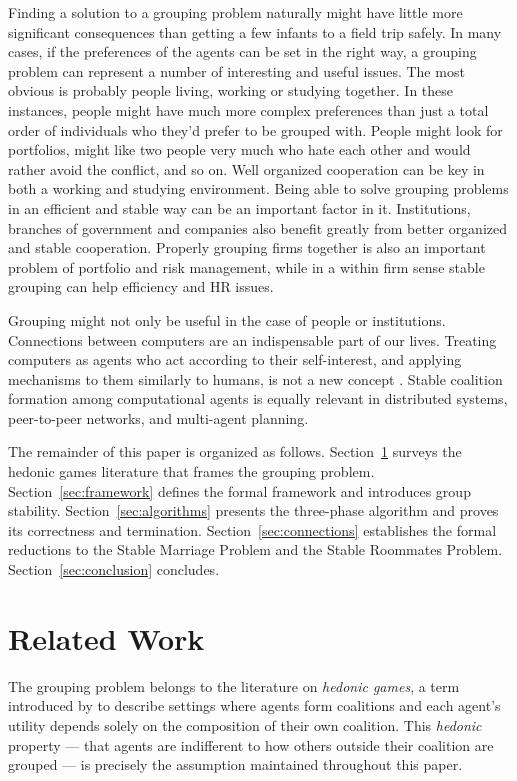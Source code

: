 \documentclass{elsarticle}
\begin{document}
Finding a solution to a grouping problem naturally might have little more significant consequences than getting a few infants to a field trip safely. In many cases, if the preferences of the agents can be set in the right way, a grouping problem can represent a number of  interesting and useful issues. The most obvious is probably people living, working or studying together. In these instances, people might have much more complex preferences than just a total order of individuals who they'd prefer to be grouped with. People might look for portfolios, might like two people very much who hate each other and would rather avoid the conflict, and so on. Well organized cooperation can be key in both a working and studying environment. Being able to solve grouping problems in an efficient and stable way can be an important factor in it. Institutions, branches of government and companies also benefit greatly from better organized and stable cooperation. Properly grouping firms together is also an important problem of portfolio and risk management, while in a within firm sense stable grouping can help efficiency and HR issues.

Grouping might not only be useful in the case of people or institutions. Connections between computers are an indispensable part of our lives. Treating computers as agents who act according to their self-interest, and applying mechanisms to them similarly to humans, is not a new concept \citep{nisan99}. Stable coalition formation among computational agents is equally relevant in distributed systems, peer-to-peer networks, and multi-agent planning.

The remainder of this paper is organized as follows. Section~\ref{sec:related} surveys the hedonic games literature that frames the grouping problem. Section~\ref{sec:framework} defines the formal framework and introduces group stability. Section~\ref{sec:algorithms} presents the three-phase algorithm and proves its correctness and termination. Section~\ref{sec:connections} establishes the formal reductions to the Stable Marriage Problem and the Stable Roommates Problem. Section~\ref{sec:conclusion} concludes.

\section{Related Work}
\label{sec:related}

The grouping problem belongs to the literature on \emph{hedonic games}, a term introduced by \cite{drzezegreenberg80} to describe settings where agents form coalitions and each agent's utility depends solely on the composition of their own coalition. This \emph{hedonic} property --- that agents are indifferent to how others outside their coalition are grouped --- is precisely the assumption maintained throughout this paper.
\end{document}
